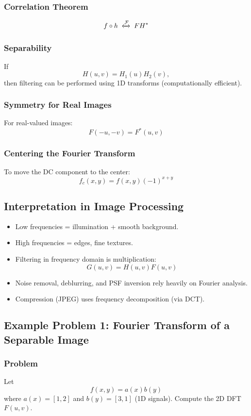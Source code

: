 \documentclass{AnantDocumentation}
\begin{document}
\subsubsection{Correlation Theorem}
\[
f \circ h \;\xleftrightarrow{\mathcal{F}}\; F H^*
\]

\subsubsection{Separability}
If
\[
H(u,v) = H_1(u)H_2(v),
\]
then filtering can be performed using 1D transforms (computationally efficient).

\subsubsection{Symmetry for Real Images}
For real-valued images:
\[
F(-u,-v) = F^*(u,v)
\]

\subsubsection{Centering the Fourier Transform}
To move the DC component to the center:
\[
f_c(x,y) = f(x,y)(-1)^{x+y}
\]

\subsection{Interpretation in Image Processing}

\begin{itemize}
\item Low frequencies = illumination + smooth background.
\item High frequencies = edges, fine textures.
\item Filtering in frequency domain is multiplication:
\[
G(u,v) = H(u,v)F(u,v)
\]
\item Noise removal, deblurring, and PSF inversion rely heavily on Fourier analysis.
\item Compression (JPEG) uses frequency decomposition (via DCT).
\end{itemize}

\subsection{Example Problem 1: Fourier Transform of a Separable Image}

\subsubsection*{Problem}
Let
\[
f(x,y) = a(x)b(y)
\]
where $a(x) = [1, 2]$ and $b(y) = [3, 1]$ (1D signals).  
Compute the 2D DFT $F(u,v)$.
\end{document}

